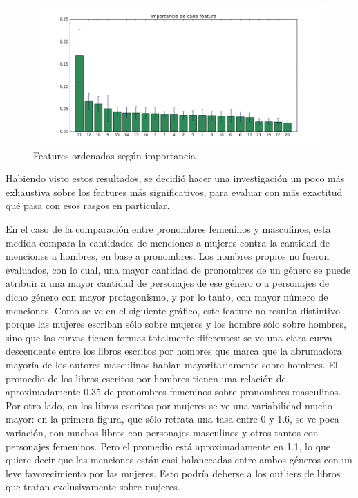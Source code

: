 \documentclass[
journal=jacsat, %
manuscript=article]{achemso}
\begin{document}
\begin{figure}[H]
  \centering
  \includegraphics[width=1\textwidth]{graficos/importances.png}
  \caption{Features ordenadas según importancia}
\end{figure}

Habiendo visto estos resultados, se decidió hacer una investigación un poco más exhaustiva sobre los features más significativos, para evaluar con más exactitud qué pasa con esos rasgos en particular.

En el caso de la comparación entre pronombres femeninos y masculinos, esta medida compara la cantidades de menciones a mujeres contra la cantidad de menciones a hombres, en base a pronombres. Los nombres propios no fueron evaluados, con lo cual, una mayor cantidad de pronombres de un género se puede atribuir a una mayor cantidad de personajes de ese género o a personajes de dicho género con mayor protagonismo, y por lo tanto, con mayor número de menciones. Como se ve en el siguiente gráfico, este feature no resulta distintivo porque las mujeres escriban sólo sobre mujeres y los hombre sólo sobre hombres, sino que las curvas tienen formas totalmente diferentes: se ve una clara curva descendente entre los libros escritos por hombres que marca que la abrumadora mayoría de los autores masculinos hablan mayoritariamente sobre hombres. El promedio de los libros escritos por hombres tienen una relación de aproximadamente 0.35 de pronombres femeninos sobre pronombres masculinos. Por otro lado, en los libros escritos por mujeres se ve una variabilidad mucho mayor: en la primera figura, que sólo retrata una tasa entre 0 y 1.6, se ve poca variación, con muchos libros con personajes masculinos y otros tantos con personajes femeninos. Pero el promedio está aproximadamente en 1.1, lo que quiere decir que las menciones están casi balanceadas entre ambos géneros con un leve favorecimiento por las mujeres. Esto podría deberse a los outliers de libros que tratan exclusivamente sobre mujeres.
\end{document}
